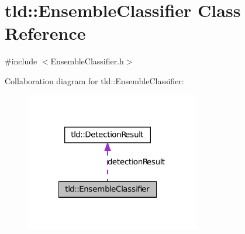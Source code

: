 \hypertarget{classtld_1_1_ensemble_classifier}{
\section{tld::EnsembleClassifier Class Reference}
\label{classtld_1_1_ensemble_classifier}
}


{\ttfamily \#include $<$EnsembleClassifier.h$>$}



Collaboration diagram for tld::EnsembleClassifier:
\nopagebreak
\begin{figure}[H]
\begin{center}
\leavevmode
\includegraphics[width=216pt]{classtld_1_1_ensemble_classifier__coll__graph}
\end{center}
\end{figure}
